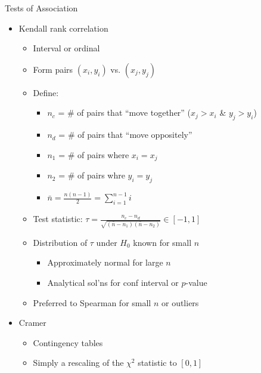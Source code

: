 \begin{frame}{Tests of Association}
    \begin{itemize}
        \item Kendall rank correlation
        \begin{itemize}
            \item Interval or ordinal
            \item Form pairs $(x_i,y_i)$ vs. $(x_j,y_j)$
            \item Define:
            \begin{itemize}
                \item $n_c$ = \# of pairs that ``move together'' ($x_j>x_i$ \& $y_j>y_i$)
                \item $n_d$ = \# of pairs that ``move oppositely''
                \item $n_1$ = \# of pairs where $x_i=x_j$
                \item $n_2$ = \# of pairs whre $y_i=y_j$
                \item $\bar{n}=\frac{n(n-1)}{2}=\sum_{i=1}^{n-1} i$
            \end{itemize}
            \item Test statistic: $\tau = \frac{n_c-n_d}{\sqrt{(\bar{n}-n_1)(\bar{n}-n_2)}} \in [-1,1]$
            \item Distribution of $\tau$ under $H_0$ known for small $n$
            \begin{itemize}
                \item Approximately normal for large $n$
                \item Analytical sol'ns for conf interval or $p$-value
            \end{itemize}
            \item Preferred to Spearman for small $n$ or outliers
        \end{itemize}
        \item Cramer
        \begin{itemize}
            \item Contingency tables
            \item Simply a rescaling of the $\chi^2$ statistic to $[0,1]$
        \end{itemize}
    \end{itemize}
    
\end{frame}



